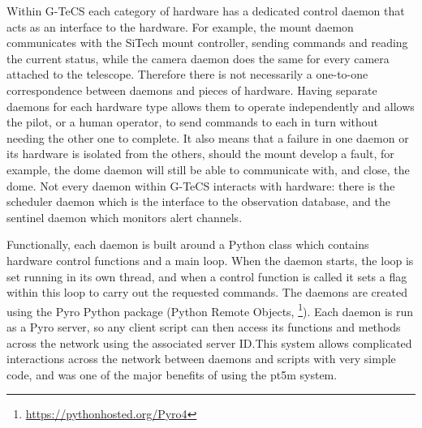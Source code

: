 \begin{colsection}
Within G-TeCS each category of hardware has a dedicated control daemon that acts as an interface to the hardware. For example, the mount daemon communicates with the SiTech mount controller, sending commands and reading the current status, while the camera daemon does the same for every camera attached to the telescope. Therefore there is not necessarily a one-to-one correspondence between daemons and pieces of hardware. Having separate daemons for each hardware type allows them to operate independently and allows the pilot, or a human operator, to send commands to each in turn without needing the other one to complete. It also means that a failure in one daemon or its hardware is isolated from the others, should the mount develop a fault, for example, the dome daemon will still be able to communicate with, and close, the dome. Not every daemon within G-TeCS interacts with hardware: there is the scheduler daemon which is the interface to the observation database, and the sentinel daemon which monitors alert channels.

Functionally, each daemon is built around a Python class which contains hardware control functions and a main loop. When the daemon starts, the loop is set running in its own thread, and when a control function is called it sets a flag within this loop to carry out the requested commands. The daemons are created using the Pyro Python package (Python Remote Objects, \footnote{\url{https://pythonhosted.org/Pyro4}}). Each daemon is run as a Pyro server, so any client script can then access its functions and methods across the network using the associated server ID.\@ This system allows complicated interactions across the network between daemons and scripts with very simple code, and was one of the major benefits of using the pt5m system.

\end{colsection}



